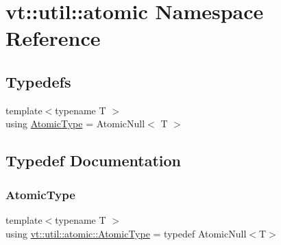 \hypertarget{namespacevt_1_1util_1_1atomic}{}\section{vt\+:\+:util\+:\+:atomic Namespace Reference}
\label{namespacevt_1_1util_1_1atomic}
\subsection*{Typedefs}
\begin{DoxyCompactItemize}
\item 
{\footnotesize template$<$typename T $>$ }\\using \hyperlink{namespacevt_1_1util_1_1atomic_a38dc3fa22349b32b4dd7171795815f77}{Atomic\+Type} = Atomic\+Null$<$ T $>$
\end{DoxyCompactItemize}


\subsection{Typedef Documentation}
\mbox{\label{namespacevt_1_1util_1_1atomic_a38dc3fa22349b32b4dd7171795815f77}} 
\subsubsection{\texorpdfstring{Atomic\+Type}{AtomicType}}
{\footnotesize\ttfamily template$<$typename T $>$ \\
using \hyperlink{namespacevt_1_1util_1_1atomic_a38dc3fa22349b32b4dd7171795815f77}{vt\+::util\+::atomic\+::\+Atomic\+Type} = typedef Atomic\+Null$<$T$>$}

